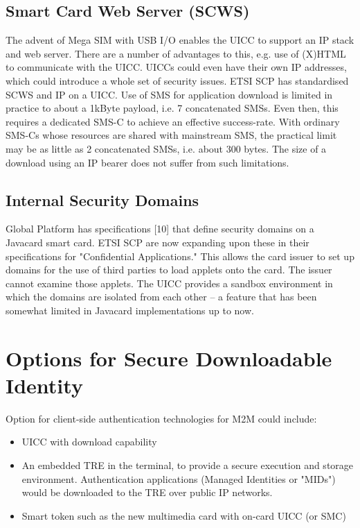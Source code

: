 \documentclass[12pt]{article}
\begin{document}
\subsection{Smart Card Web Server (SCWS)}
The advent of Mega SIM with USB I/O enables the UICC to support an IP stack and web server. There are a number of advantages to this, e.g. use of (X)HTML to communicate with the UICC. UICCs could even have their own IP addresses, which could introduce a whole set of security issues. ETSI SCP has standardised SCWS and IP on a UICC. Use of SMS for application download is limited in practice to about a 1kByte payload, i.e. 7 concatenated SMSs. Even then, this requires a dedicated SMS-C to achieve an effective success-rate. With ordinary SMS-Cs whose resources are shared with mainstream SMS, the practical limit may be as little as 2 concatenated SMSs, i.e. about 300 bytes. The size of a download using an IP bearer does not suffer from such limitations.

\subsection{Internal Security Domains}
Global Platform has specifications [10] that define security domains on a Javacard smart card. ETSI SCP are now expanding upon these in their specifications for "Confidential Applications." This allows the card issuer to set up domains for the use of third parties to load applets onto the card. The issuer cannot examine those applets. The UICC provides a sandbox environment in which the domains are isolated from each other – a feature that has been somewhat limited in Javacard implementations up to now.





 
\section{Options for Secure Downloadable Identity} 
Option for client-side authentication technologies for M2M could include:
\begin{itemize}
\item UICC with download capability
\item An embedded TRE in the terminal, to provide a secure execution and storage
environment. Authentication applications (Managed Identities or "MIDs")
would be downloaded to the TRE over public IP networks.
\item Smart token such as the new multimedia card with on-card UICC (or SMC)

\end{itemize}
\end{document}
